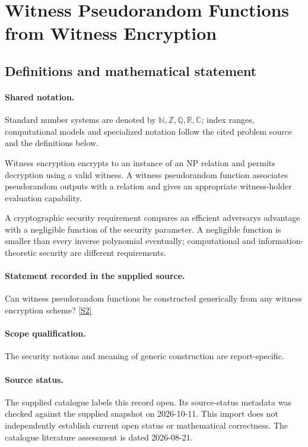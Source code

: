 \documentclass[11pt]{article}
\newcommand{\sref}[2]{\hyperlink{source:#1:#2}{[S#2]}}
\begin{document}
\section{Witness Pseudorandom Functions from Witness Encryption}\label{statement}

\subsection{Definitions and mathematical statement}

\paragraph{Shared notation.}Standard number systems are denoted by $\mathbb N,\mathbb Z,\mathbb Q,\mathbb R,\mathbb C$; index ranges, computational models and specialized notation follow the cited problem source and the definitions below.


Witness encryption encrypts to an instance of an NP relation and permits decryption using a valid witness. A witness pseudorandom function associates pseudorandom outputs with a relation and gives an appropriate witness-holder evaluation capability.

A cryptographic security requirement compares an efficient adversary\textquotesingle s advantage with a negligible function of the security parameter. A negligible function is smaller than every inverse polynomial eventually; computational and information-theoretic security are different requirements.
\paragraph{Statement recorded in the supplied source.}
Can witness pseudorandom functions be constructed generically from any witness encryption scheme? \sref{statement}{2}
\paragraph{Scope qualification.}
The security notions and meaning of generic construction are report-specific.
\paragraph{Source status.}
The supplied catalogue labels this record open. Its source-status metadata was checked against the supplied snapshot on 2026-10-11. This import does not independently establish current open status or mathematical correctness. The catalogue literature assessment is dated 2026-08-21.
\end{document}
